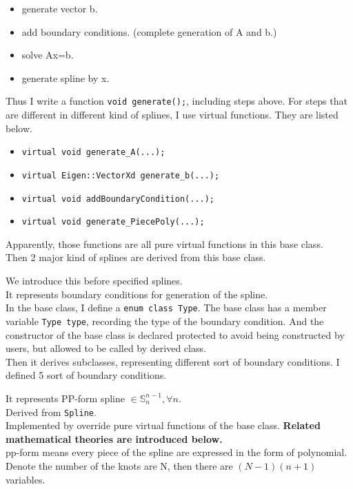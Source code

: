 \documentclass[a4paper]{article}
\begin{document}
\begin{description}
\begin{itemize}
    \item generate vector b.
    \item add boundary conditions. (complete generation of A and b.)
    \item solve Ax=b.
    \item generate spline by x.
  \end{itemize}
  Thus I write a function \texttt{void generate();}, including steps above. 
  For steps that are different in different kind of splines, I use virtual functions. They are listed below.
  \begin{itemize}
    \item \texttt{virtual void generate\_A(...);}
    \item \texttt{virtual Eigen::VectorXd generate\_b(...);}
    \item \texttt{virtual void addBoundaryCondition(...);}
    \item \texttt{virtual void generate\_PiecePoly(...);}
  \end{itemize}
  Apparently, those functions are all pure virtual functions in this base class.\\
  Then 2 major kind of splines are derived from this base class.
  \item[BoundaryCondition]
  We introduce this before specified splines.\\
  It represents boundary conditions for generation of the spline. \\
  In the base class, I define a \texttt{enum class Type}.
  The base class has a member variable \texttt{Type type}, recording the type of the boundary condition. 
  And the constructor of the base class is declared protected to avoid being constructed by users, but allowed to be called by derived class.\\
  Then it derives subclasses, representing different sort of boundary conditions. I defined 5 sort of boundary conditions.
  \item[PpFormSpline] 
  It represents PP-form spline $\in \mathbb{S}_n^{n-1}, \forall n$.\\
  Derived from \texttt{Spline}.\\
  Implemented by override pure virtual functions of the base class. \textbf{Related mathematical theories are introduced below.}\\
  pp-form means every piece of the spline are expressed in the form of polynomial. 
  Denote the number of the knots are N, then there are $(N-1)(n+1)$ variables.\\

\end{description}
\end{document}
